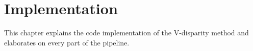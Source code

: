 
\chapter{Implementation}
\label{chp:Implementation}

This chapter explains the code implementation of the V-disparity method and elaborates on every part of the pipeline.